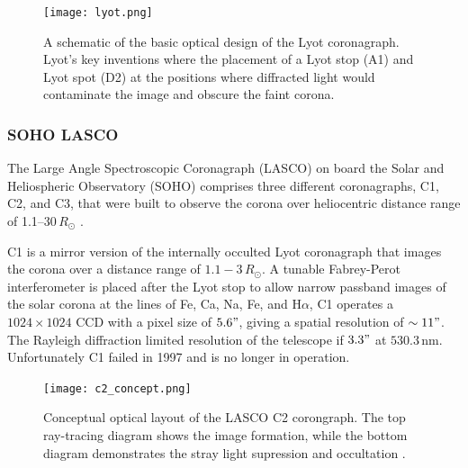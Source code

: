 \begin{figure}[!t]
\begin{center}
\texttt{[image: lyot.png]}
\caption[The Lyot coronagraph]{A schematic of the basic optical design of the Lyot coronagraph. Lyot's key inventions where the placement of a Lyot stop (A1) and Lyot spot (D2) at the positions where diffracted light would contaminate the image and obscure the faint corona.}
\label{fig:lyot}
\end{center}
\end{figure}

\subsubsection{SOHO LASCO}\label{sec:23}

The Large Angle Spectroscopic Coronagraph (LASCO) on board the Solar and Heliospheric Observatory (SOHO) comprises three different coronagraphs, C1, C2, and C3, that were built to observe the corona over heliocentric distance range of 1.1--30\,$R_{\odot}$ \citep{bru95}. 

C1 is a mirror version of the internally occulted Lyot coronagraph that images the corona over a distance range of $1.1- 3\,R_{\odot}$. A tunable Fabrey-Perot interferometer is placed after the Lyot stop to allow narrow passband images of the solar corona at the lines of Fe, Ca, Na, Fe, and H$\alpha$,
C1 operates a $1024\times1024$ CCD with a pixel size of $5.6"$, giving a spatial resolution of $\sim11"$. The Rayleigh diffraction limited resolution of the telescope if $3.3"$ at $530.3$\,nm. Unfortunately C1 failed in 1997 and is no longer in operation. 
\begin{figure}[!t]
\begin{center}
\texttt{[image: c2\_concept.png]}
\caption[The LASCO C2 coronagraph optics]{Conceptual optical layout of the LASCO C2 corongraph. The top ray-tracing diagram shows the image formation, while the bottom diagram demonstrates the stray light supression and occultation \citep{bru95}.}
\label{fig:c2_concept}
\end{center}
\end{figure}

